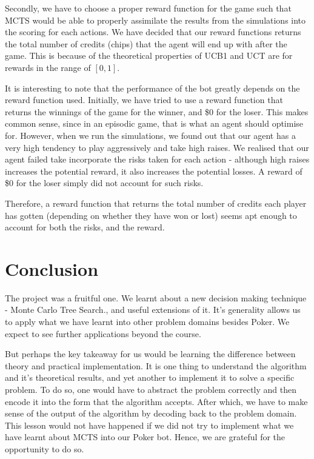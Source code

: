 \documentclass[11pt, a4paper, oneside]{article}
\begin{document}
Secondly, we have to choose a proper reward function for the game such that MCTS would be able to properly assimilate the results from the simulations into the scoring for each actions. We have decided that our reward functions returns the total number of credits (chips) that the agent will end up with after the game. This is because of the theoretical properties of UCB1 and UCT are for rewards in the range of $[0,1]$.

It is interesting to note that the performance of the bot greatly depends on the reward function used. Initially, we have tried to use a reward function that returns the winnings of the game for the winner, and \$0 for the loser. This makes common sense, since in an episodic game, that is what an agent should optimise for. However, when we run the simulations, we found out that our agent has a very high tendency to play aggressively and take high raises. We realised that our agent failed take incorporate the risks taken for each action - although high raises increases the potential reward, it also increases the potential losses. A reward of \$0 for the loser simply did not account for such risks.

Therefore, a reward function that returns the total number of credits each player has gotten (depending on whether they have won or lost) seems apt enough to account for both the risks, and the reward.


\section{Conclusion}
The project was a fruitful one. We learnt about a new decision making technique - Monte Carlo Tree Search., and useful extensions of it. It's generality allows us to apply what we have learnt into other problem domains besides Poker. We expect to see further applications beyond the course.

But perhaps the key takeaway for us would be learning the difference between theory and practical implementation. It is one thing to understand the algorithm and it's theoretical results, and yet another to implement it to solve a specific problem. To do so, one would have to abstract the problem correctly and then encode it into the form that the algorithm accepts. After which, we have to make sense of the output of the algorithm by decoding back to the problem domain. This lesson would not have happened if we did not try to implement what we have learnt about MCTS into our Poker bot. Hence, we are grateful for the opportunity to do so.
\end{document}
